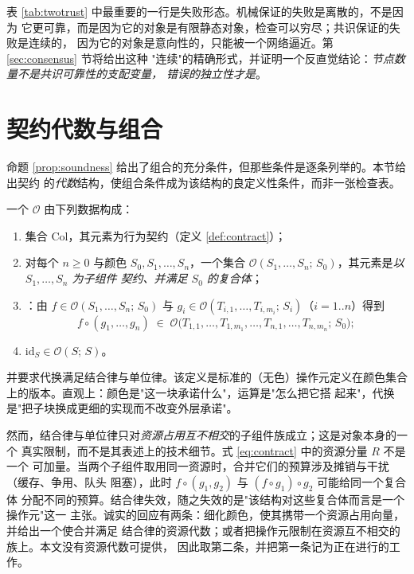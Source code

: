 表 \ref{tab:twotrust} 中最重要的一行是失败形态。机械保证的失败是离散的，不是因为
它更可靠，而是因为它的对象是有限静态对象，检查可以穷尽；共识保证的失败是连续的，
因为它的对象是意向性的，只能被一个网络逼近。第 \ref{sec:consensus} 节将给出这种
"连续"的精确形式，并证明一个反直觉结论：\emph{节点数量不是共识可靠性的支配变量，
错误的独立性才是}。

\section{契约代数与组合}\label{sec:operad}

命题 \ref{prop:soundness} 给出了组合的充分条件，但那些条件是逐条列举的。本节给出契约
的\emph{代数}结构，使组合条件成为该结构的良定义性条件，而非一张检查表。

\begin{definition}[契约操作元]\label{def:operad}
一个 $\mathcal{O}$ 由下列数据构成：
\begin{enumerate}[label=(\roman*)]
\item {}集合 $\mathrm{Col}$，其元素为行为契约（定义 \ref{def:contract}）；
\item 对每个 $n \ge 0$ 与颜色 $S_0, S_1, \dots, S_n$，一个集合
      $\mathcal{O}(S_1, \dots, S_n;\, S_0)$，其元素是\emph{以 $S_1,\dots,S_n$ 为子组件
      契约、并满足 $S_0$ 的复合体}；
\item {}：由 $f \in \mathcal{O}(S_1,\dots,S_n;\,S_0)$ 与
      $g_i \in \mathcal{O}(T_{i,1},\dots,T_{i,m_i};\,S_i)$（$i = 1..n$）得到
      \[
      f \circ (g_1, \dots, g_n) \;\in\;
      \mathcal{O}\bigl(T_{1,1},\dots,T_{1,m_1},\dots,T_{n,1},\dots,T_{n,m_n};\,S_0\bigr);
      \]
\item {} $\mathrm{id}_S \in \mathcal{O}(S;\,S)$。
\end{enumerate}
并要求代换满足结合律与单位律。该定义是标准的（无色）操作元定义在颜色集合上的版本\cite{leinster2004}。直观上：颜色是"这一块承诺什么"，运算是"怎么把它搭
起来"，代换是"把子块换成更细的实现而不改变外层承诺"。

然而，结合律与单位律只对\emph{资源占用互不相交}的子组件族成立；这是对象本身的一个
真实限制，而不是其表述上的技术细节。式 \eqref{eq:contract} 中的资源分量 $R$ 不是一个
可加量。当两个子组件取用同一资源时，合并它们的预算涉及摊销与干扰（缓存、争用、队头
阻塞），此时 $f \circ (g_1, g_2)$ 与 $(f \circ g_1) \circ g_2$ 可能给同一个复合体
分配不同的预算。结合律失效，随之失效的是"该结构对这些复合体而言是一个操作元"这一
主张。诚实的回应有两条：细化颜色，使其携带一个资源占用向量，并给出一个使合并满足
结合律的资源代数；或者把操作元限制在资源互不相交的族上。本文没有资源代数可提供，
因此取第二条，并把第一条记为正在进行的工作。
\end{definition}

